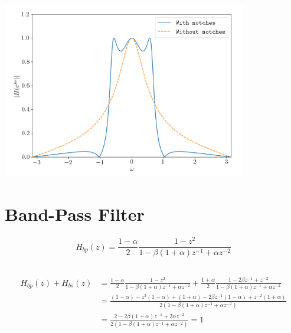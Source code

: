\documentclass{article}
\begin{document}
\begin{center}
    \includegraphics[width=0.8\textwidth]{Screenshot 2021-04-26 at 15-44-44 Files.png}
\end{center}

\section{Band-Pass Filter}

\begin{equation}
    H_{bp}(z) = \frac{1 - \alpha}{2} \frac{1 - z^2}{1 - \beta (1 + \alpha) z^{-1} + \alpha z^{-2}}
\end{equation}

\subsection{}

\begin{align}
    H_{bp}(z) + H_{bs}(z) &= \frac{1 - \alpha}{2} \frac{1 - z^2}{1 - \beta (1 + \alpha) z^{-1} + \alpha z^{-2}} + \frac{1 + \alpha}{2} \frac{1 - 2\beta z^{-1} + z^{-2}}{1 - \beta (1 + \alpha) z^{-1} + \alpha z^{-2}} \\
    &= \frac{(1 - \alpha) - z^2 (1 - \alpha) + (1 + \alpha) - 2\beta z^{-1} (1 - \alpha) + z^{-2} (1 + \alpha)}{2 (1 - \beta (1 + \alpha) z^{-1} + \alpha z^{-2})} \\
    &= \frac{2 - 2 \beta (1 + \alpha) z^{-1} + 2\alpha z^{-2}}{2 (1 - \beta (1 + \alpha) z^{-1} + \alpha z^{-2})} = 1
\end{align}

\subsection{}
\end{document}
